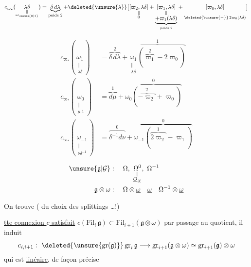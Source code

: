 
\[ c_{\varpi_*}(\underset{\substack{\Vert\\\omega_{\unsure{0|1}}}}{\lambda\delta})
 =\underbrace{\delta\,d\lambda}_{\text{poids 2}}+
 \deleted{\unsure{\lambda}}\bigl[\underset{\substack{\Vert\\0}}{[\varpi_2,\lambda\delta]}+
 \underset{\substack{\Vert\\\underbrace{+\varpi_1(\lambda\delta)}_{\text{poids 2}}}}{[\varpi_1,\lambda\delta]}+
 \underset{\substack{\phantom{\Vert}\\\deleted{\unsure{-}}\,2\varpi_0(\lambda\delta)}}{[\varpi_0,\lambda\delta]}\bigr] \]

\[ \begin{aligned}
 c_{\varpi_*}(\underset{\substack{\Vert\\\lambda\delta}}{\omega_1})&=\overbrace{\delta\,d\lambda}^{2}+\overbrace{\underset{\substack{\Vert\\\lambda\delta}}{\omega_1}(\overbrace{\varpi_1}^{2}-2\varpi_0)}^{1}\\
 c_{\varpi_*}(\underset{\substack{\Vert\\\mu.1}}{\omega_0})&=\overbrace{d\mu}^{1}+\overbrace{\omega_0(\overbrace{-\varpi_2}^{2}+\varpi_0)}^{0}\\
 c_{\varpi_*}(\underset{\substack{\Vert\\\nu\delta^{-1}}}{\omega_{-1}})&=\overbrace{\delta^{-1}d\nu}^{0}+\overbrace{\omega_{-1}(\overbrace{2\varpi_2}^{1}-\varpi_1)}^{0}
 \end{aligned} \]

\[ \begin{aligned}
 \unsure{\mathfrak g|\mathcal G}&:\quad \Omega,\ \underset{\substack{\Vert\\\underline O_X}}{\Omega^0},\ \Omega^{-1}\\
 \mathfrak g\otimes\omega&:\quad\Omega\otimes\underline\omega\quad\underline\omega\quad\Omega^{-1}\otimes\underline\omega
 \end{aligned} \]

On trouve  ( du choix des splittings \ldots !)

\uline{tte connexion $c$ satisfait} $c(\mathrm{Fil}_i\,\mathfrak g)\subset\mathrm{Fil}_{i+1}(\mathfrak g\otimes\underline\omega)$ par passage au quotient, il induit
\[ c_{i,i+1}:\ \deleted{\unsure{\mathrm{gr}(\mathfrak g)}}\,\mathrm{gr}_i\,\mathfrak g\longrightarrow\mathrm{gr}_{i+1}(\mathfrak g\otimes\omega)\simeq\mathrm{gr}_{i+1}(\mathfrak g)\otimes\omega \]
qui est \uline{linéaire}, de façon précise

